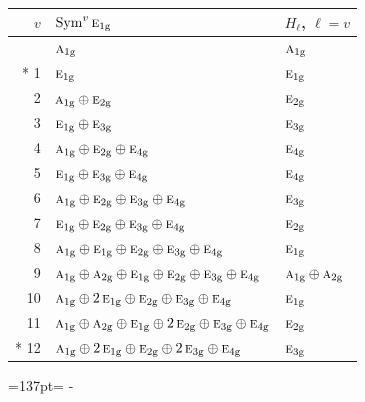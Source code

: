 \documentclass[10pt,a4paper]{article}
\newcommand{\needspace}[1]{\par\penalty-100\begingroup\dimen0=#1\relax\dimen2=\pagegoal
  \advance\dimen2-\pagetotal\ifdim\dimen0>\dimen2\relax\ifdim\dimen2>0pt\vfil\break\fi\fi
  \endgroup}
\numberwithin{equation}{section}
\newcommand{\irr}[1]{\text{\normalfont\scshape #1}}
\newcommand{\ptag}[1]{\mathrm{#1}}
\begin{document}
{\small\begin{longtable}{@{}rll@{}}\toprule
$v$ & $\operatorname{Sym}^{v}\irr{e}_{1\ptag{g}}$ & $H_\ell$, $\ell = v$\\\midrule\endhead
\bottomrule\endfoot\endlastfoot
0 & $\irr{a}_{1\ptag{g}}$ & $\irr{a}_{1\ptag{g}}$\\*
1 & $\irr{e}_{1\ptag{g}}$ & $\irr{e}_{1\ptag{g}}$\\
2 & $\irr{a}_{1\ptag{g}} \oplus \irr{e}_{2\ptag{g}}$ & $\irr{e}_{2\ptag{g}}$\\
3 & $\irr{e}_{1\ptag{g}} \oplus \irr{e}_{3\ptag{g}}$ & $\irr{e}_{3\ptag{g}}$\\
4 & $\irr{a}_{1\ptag{g}} \oplus \irr{e}_{2\ptag{g}} \oplus \irr{e}_{4\ptag{g}}$ & $\irr{e}_{4\ptag{g}}$\\
5 & $\irr{e}_{1\ptag{g}} \oplus \irr{e}_{3\ptag{g}} \oplus \irr{e}_{4\ptag{g}}$ & $\irr{e}_{4\ptag{g}}$\\
6 & $\irr{a}_{1\ptag{g}} \oplus \irr{e}_{2\ptag{g}} \oplus \irr{e}_{3\ptag{g}} \oplus \irr{e}_{4\ptag{g}}$ & $\irr{e}_{3\ptag{g}}$\\
7 & $\irr{e}_{1\ptag{g}} \oplus \irr{e}_{2\ptag{g}} \oplus \irr{e}_{3\ptag{g}} \oplus \irr{e}_{4\ptag{g}}$ & $\irr{e}_{2\ptag{g}}$\\
8 & $\irr{a}_{1\ptag{g}} \oplus \irr{e}_{1\ptag{g}} \oplus \irr{e}_{2\ptag{g}} \oplus \irr{e}_{3\ptag{g}} \oplus \irr{e}_{4\ptag{g}}$ & $\irr{e}_{1\ptag{g}}$\\
9 & $\irr{a}_{1\ptag{g}} \oplus \irr{a}_{2\ptag{g}} \oplus \irr{e}_{1\ptag{g}} \oplus \irr{e}_{2\ptag{g}} \oplus \irr{e}_{3\ptag{g}} \oplus \irr{e}_{4\ptag{g}}$ & $\irr{a}_{1\ptag{g}} \oplus \irr{a}_{2\ptag{g}}$\\
10 & $\irr{a}_{1\ptag{g}} \oplus 2\,\irr{e}_{1\ptag{g}} \oplus \irr{e}_{2\ptag{g}} \oplus \irr{e}_{3\ptag{g}} \oplus \irr{e}_{4\ptag{g}}$ & $\irr{e}_{1\ptag{g}}$\\
11 & $\irr{a}_{1\ptag{g}} \oplus \irr{a}_{2\ptag{g}} \oplus \irr{e}_{1\ptag{g}} \oplus 2\,\irr{e}_{2\ptag{g}} \oplus \irr{e}_{3\ptag{g}} \oplus \irr{e}_{4\ptag{g}}$ & $\irr{e}_{2\ptag{g}}$\\*
12 & $\irr{a}_{1\ptag{g}} \oplus 2\,\irr{e}_{1\ptag{g}} \oplus \irr{e}_{2\ptag{g}} \oplus 2\,\irr{e}_{3\ptag{g}} \oplus \irr{e}_{4\ptag{g}}$ & $\irr{e}_{3\ptag{g}}$\\
\bottomrule\end{longtable}}
\needspace{137pt}
\end{document}
